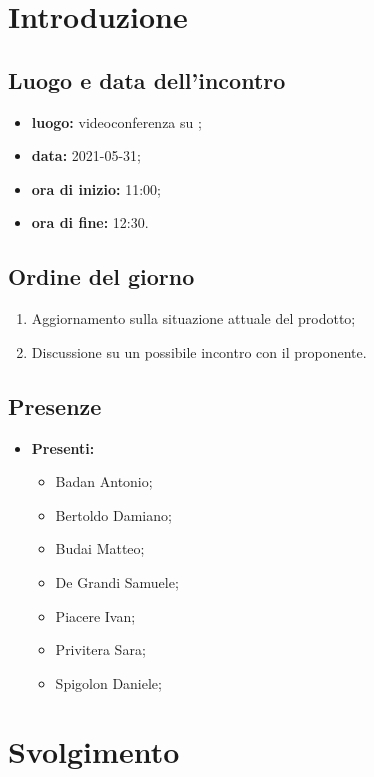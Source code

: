 \section*{Introduzione}
\subsection*{Luogo e data dell'incontro}
\begin{itemize}
	\item \textbf{luogo:} videoconferenza su ;
	\item \textbf{data:} 2021-05-31;
	\item \textbf{ora di inizio:} 11:00;
	\item \textbf{ora di fine:} 12:30.
\end{itemize}

\subsection*{Ordine del giorno}
\begin{enumerate}
	\item Aggiornamento sulla situazione attuale del prodotto;
	\item Discussione su un possibile incontro con il proponente.
		
\end{enumerate}

\subsection*{Presenze}
\begin{itemize}
	\item \textbf{Presenti: }
	\begin{itemize}
		\item Badan Antonio;
		\item Bertoldo Damiano;
		\item Budai Matteo;
		\item De Grandi Samuele;
		\item Piacere Ivan;
		\item Privitera Sara;
		\item Spigolon Daniele;
	\end{itemize}
\end{itemize}


\section*{Svolgimento}

